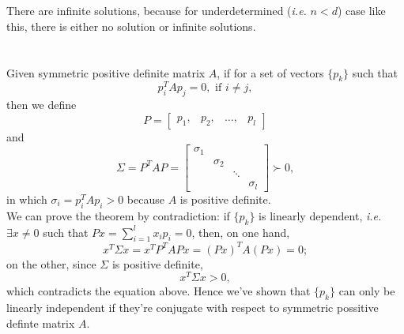 \documentclass[11pt]{article}
\begin{document}
\subsection{}

\section{}
\subsection{}
There are infinite solutions, because for underdetermined (\textit{i.e.} $n<d$) case like this, there is either no solution or infinite solutions.

\section{}
Given symmetric positive definite matrix $A$, if for a set of vectors $\{p_k\}$ such that
$$p_i^TAp_j=0,\,\,\text{if}\,\,i\neq j,$$
then we define
$$P = \begin{bmatrix} p_1, & p_2, & \dots ,& p_l\end{bmatrix} $$
and
$$\Sigma = P^TAP = \begin{bmatrix} \sigma_1 \\ & \sigma_2 \\ & & \ddots \\ & & & \sigma_l \end{bmatrix}\succ0, $$
in which $\sigma_i = p_i^TAp_i > 0$ because $A$ is positive definite.\\[0.4cm]
We can prove the theorem by contradiction: if $\{p_k\}$ is linearly dependent, \textit{i.e.} $\exists x \neq 0$ such that $Px = \sum_{i=1}^lx_ip_i=0$, then, on one hand, 
\begin{equation} 
x^T\Sigma x = x^TP^TAPx = (Px)^TA(Px) = 0;
\nonumber\end{equation} 
on the other, since $\Sigma$ is positive definite, 
$$x^T\Sigma x > 0,$$
which contradicts the equation above. Hence we've shown that $\{p_k\}$ can only be linearly independent if they're conjugate with respect to symmetric possitive definte matrix $A$.
\end{document}
